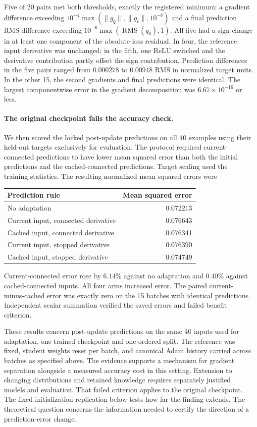 \documentclass[11pt,a4paper]{article}
\begin{document}
Five of 20 pairs met both thresholds, exactly the registered minimum:
a gradient difference exceeding $10^{-4}\max(\|g_q\|,\|g_c\|,10^{-8})$
and a final prediction RMS difference exceeding
$10^{-6}\max(\operatorname{RMS}(q_0),1)$. All five had a sign change in
at least one component of the absolute-loss residual. In four, the reference
input derivative was unchanged; in the fifth, one ReLU switched and the
derivative contribution partly offset the sign contribution. Prediction
differences in the five pairs ranged from $0.000278$ to $0.00948$ RMS
in normalized target units. In the other 15, the second gradients and
final predictions were identical. The largest componentwise error in the
gradient decomposition was $6.67\times10^{-16}$ or less.

\paragraph{The original checkpoint fails the accuracy check.}
We then scored the locked post-update predictions on all 40 examples
using their held-out targets exclusively for evaluation. The protocol
required current-connected predictions to have lower mean squared error
than both the initial predictions and the cached-connected predictions.
Target scaling used the training statistics. The resulting normalized
mean squared errors were
\begin{center}
\begin{tabular}{lr}
\hline
Prediction rule & Mean squared error\\
\hline
No adaptation & 0.072213\\
Current input, connected derivative & 0.076643\\
Cached input, connected derivative & 0.076341\\
Current input, stopped derivative & 0.076390\\
Cached input, stopped derivative & 0.074749\\
\hline
\end{tabular}
\end{center}
Current-connected error rose by $6.14\%$ against no adaptation and
$0.40\%$ against cached-connected inputs. All four arms increased error.
The paired current-minus-cached error was exactly zero on the 15 batches
with identical predictions. Independent scalar summation verified the
saved errors and failed benefit criterion.

These results concern post-update predictions on the same 40 inputs
used for adaptation, one trained checkpoint and one ordered split.
The reference was fixed, student weights reset per batch, and canonical
Adam history carried across batches as specified above. The evidence
supports a mechanism for gradient separation alongside a measured accuracy
cost in this setting. Extension to changing distributions and retained
knowledge requires separately justified models and evaluation.
That failed criterion applies to the original checkpoint. The fixed
initialization replication below tests how far the finding extends.
The theoretical question concerns the information needed to certify
the direction of a prediction-error change.
\end{document}

